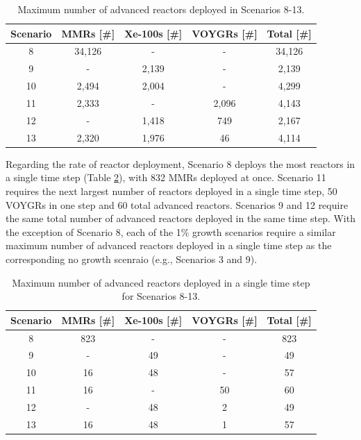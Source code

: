 \begin{table}
    \centering 
    \caption{Maximum number of advanced reactors deployed in Scenarios 8-13.}
    \label{tab:reactors_1percent}
    \begin{tabular}{c c c c c}
        \hline
        Scenario & \glspl{MMR} [\#]& Xe-100s [\#]& VOYGRs [\#] 
        & Total [\#]\\\hline
        8 & 34,126 & - & - & 34,126\\
        9 & - & 2,139 & - & 2,139 \\
        10 & 2,494 & 2,004 & - & 4,299\\
        11 & 2,333 & - & 2,096 & 4,143\\
        12 & - & 1,418 & 749 & 2,167\\
        13 & 2,320 & 1,976 & 46 & 4,114\\
        \hline
    \end{tabular}
\end{table}

Regarding the rate of reactor deployment, Scenario 8 deploys the most 
reactors in a single time step (Table 
\ref{tab:reactors_added_1percent}), with 832 \glspl{MMR} deployed at once. 
Scenario 11 requires the next largest number of reactors deployed in 
a single time step, 50 VOYGRs in one step and 60 total advanced reactors. 
Scenarios 9 and 12 require the same total number of advanced reactors 
deployed in the same time step. With the exception of Scenario 8, each of 
the 1\% growth scenarios require a similar maximum number of advanced 
reactors deployed in a single time step as the corresponding no growth 
scenraio (e.g., Scenarios 3 and 9). 

\begin{table}
    \centering 
    \caption{Maximum number of advanced reactors deployed in a single 
    time step for Scenarios 8-13.}
    \label{tab:reactors_added_1percent}
    \begin{tabular}{c c c c c}
        \hline
        Scenario & \glspl{MMR} [\#] & Xe-100s [\#] & VOYGRs [\#] 
        & Total [\#]\\\hline
        8 & 823 & - & - & 823\\
        9 & - & 49 & - & 49\\
        10 & 16 & 48 & - & 57\\
        11 & 16 & - & 50 & 60\\
        12 & - & 48 & 2 & 49\\
        13 & 16 & 48 & 1 & 57\\
        \hline
    \end{tabular}
\end{table}

